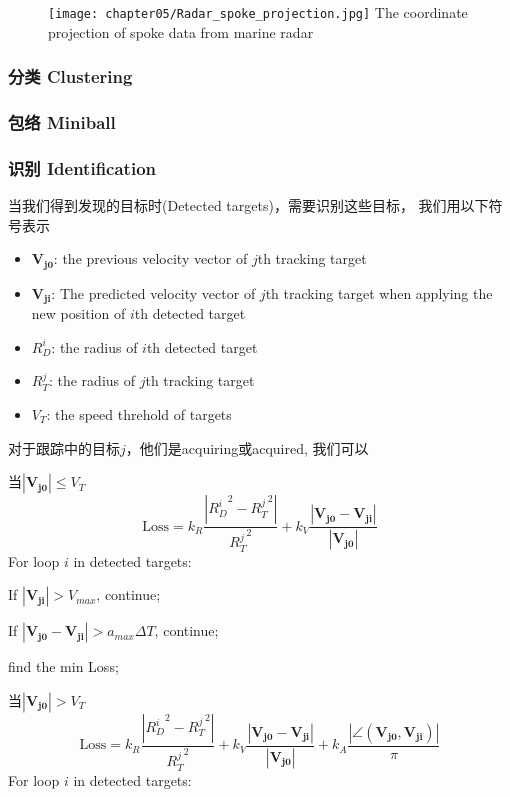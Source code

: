 \begin{figure}[!htp]
  \centering
  \texttt{[image: chapter05/Radar\_spoke\_projection.jpg]}
    {The coordinate projection of spoke data from marine radar}
  \label{fig:Radar_spoke_projection}
\end{figure}

\subsubsection{分类 Clustering}

\subsubsection{包络 Miniball}

\subsubsection{识别 Identification}
当我们得到发现的目标时(Detected targets)，需要识别这些目标，
我们用以下符号表示
\begin{itemize}
    \item $\bm{V_{j0}}$: the previous velocity vector of $j$th tracking target
    \item $\bm{V_{ji}}$: The predicted velocity vector of $j$th tracking target
                        when applying the new position of $i$th detected target
    \item $R_D^i$: the radius of $i$th detected target
    \item $R_T^j$: the radius of $j$th tracking target
    \item $V_T$: the speed threhold of targets
\end{itemize}

对于跟踪中的目标$j$，他们是acquiring或acquired, 我们可以

当$|\bm{V_{j0}}| \leq V_T$
\begin{equation}
  \text{Loss}=k_R \frac{|{R_D^i}^2-{R_T^j}^2|}{{R_T^j}^2} +
            k_V \frac{|\bm{V_{j0}}-\bm{V_{ji}}|}{|\bm{V_{j0}}|}
\end{equation}
For loop $i$ in detected targets:

\quad If $|\bm{V_{ji}}|>V_{max}$, continue;

\quad If $|\bm{V_{j0}}-\bm{V_{ji}}|>a_{max} \Delta T$, continue;

find the min Loss;

当$|\bm{V_{j0}}| > V_T$
\begin{equation}
  \text{Loss}=k_R \frac{|{R_D^i}^2-{R_T^j}^2|}{{R_T^j}^2} +
            k_V \frac{|\bm{V_{j0}}-\bm{V_{ji}}|}{|\bm{V_{j0}}|}  +
            k_A \frac{|\angle (\bm{V_{j0}}, \bm{V_{ji}})|}{\pi}
\end{equation}
For loop $i$ in detected targets:

